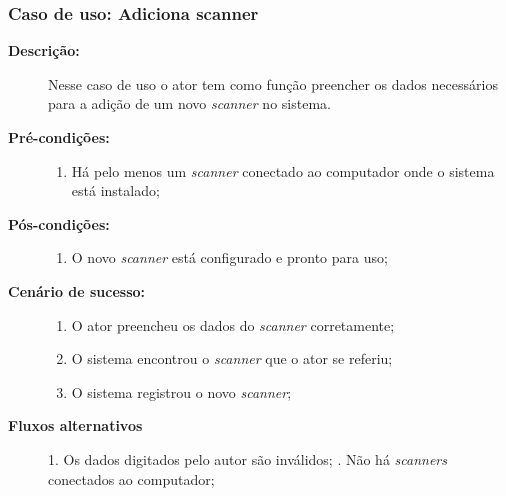 \subsubsection{Caso de uso: Adiciona scanner}
\begin{description}
    \item[{\bf Descrição:}] Nesse caso de uso o ator tem como função preencher os dados necessários para a adição de um novo {\it scanner} no sistema.
    \item[{\bf Pré-condições:}]
        \begin{enumerate}
            \item Há pelo menos um {\it scanner} conectado ao computador onde o sistema está instalado;
        \end{enumerate}
    \item[{\bf Pós-condições:}] 
        \begin{enumerate}
            \item O novo {\it scanner} está configurado e pronto para uso;
        \end{enumerate}
    
    \item[{\bf Cenário de sucesso:}]
        \begin{enumerate}
            \item O ator preencheu os dados do {\it scanner} corretamente;
            \item O sistema encontrou o {\it scanner} que o ator se referiu;
            \item O sistema registrou o novo {\it scanner};
        \end{enumerate}

    \item[{\bf Fluxos alternativos}]
        1. Os dados digitados pelo autor são inválidos; . Não há {\it scanners} conectados ao computador;
\end{description}

